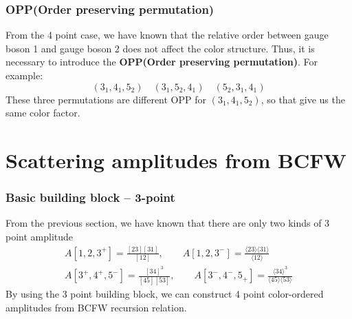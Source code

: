 \documentclass{beamer}
\newcommand{\avg}[1]{\langle #1 \rangle}
\begin{document}
\begin{frame}
    \frametitle{OPP(Order preserving permutation)}
    From the 4 point case, we have known that the relative order between gauge boson 1 and gauge boson 2 does not affect the color structure. 
    Thus, it is necessary to introduce the \textbf{OPP(Order preserving permutation)}. For example:
    \begin{equation*}
        (3_1,4_1,5_2) \quad (3_1,5_2,4_1) \quad (5_2,3_1,4_1)
    \end{equation*}
    These three permutations are different OPP for $(3_1,4_1,5_2)$, so that give us the same color factor.
\end{frame}

\section{Scattering amplitudes from BCFW}
\begin{frame}
    \frametitle{Basic building block -- 3-point}
    From the previous section, we have known that there are only two kinds of 3 point amplitude
    \begin{gather*}
        A[1,2,3^+]=\frac{[23][31]}{[12]},\qquad A[1,2,3^-]=\frac{\avg{23}\!\avg{31}}{\avg{12}}\\
        A[3^+,4^+,5^-]=\frac{[34]^3}{[45][53]},\qquad A[3^-,4^-,5_+]=\frac{\avg{34}^3}{\avg{45}\!\avg{53}}
    \end{gather*}
    By using the 3 point building block, we can construct 4 point color-ordered amplitudes from BCFW recursion relation.
\end{frame}
\end{document}
